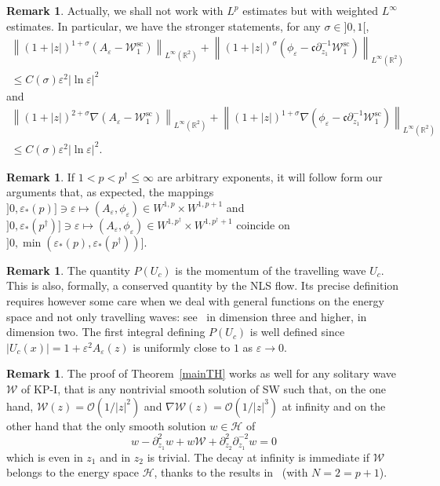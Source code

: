 \documentclass[10pt]{amsart}
\theoremstyle{definition}\newtheorem{defi}[theo]{Definition}\newtheorem{rema}[theo]{Remark}\newtheorem{exam}[theo]{Example}\newtheorem{exem}[theo]{Example}\newtheorem{nota}[theo]{Notation}
\newcommand*\p{\partial}
\newcommand*\R{\mathbb R}
\renewcommand{\sc}{\mathrm{sc}}
\newcommand*\BO{\mathcal{O}}
\newcommand*\BH{\mathcal{H}}
\newcommand*\BW{\mathcal{W}}
\newcommand*\cs{{\mathfrak c}}
\newcommand*\ii{\infty}
\newcommand*\ls{\leqslant }
\newcommand*\e{\varepsilon}
\newcommand*\lne{\lvert \ln \varepsilon \rvert}
\newcommand*\s{\sigma}
\begin{document}
\begin{rema}
Actually, we shall not work with $L^p $ estimates but with weighted $ L^\ii $ estimates. In particular, we have the stronger statements, for any $\s \in]0,1 [$,
\begin{multline*}
\left\| (1+|z|)^{1+\s} \left(A_\e - \BW_1^{\sc}\right) \right\|_{ L^\ii (\R^2)} + \left\|(1+|z|)^{\s} \left(\phi_\e - \cs \p_{z_1}^{-1} \BW_1^{\sc}\right)\right\|_{ L^\ii (\R^2)}
\\
\ls C (\s) \e^2 \lne^2
\end{multline*}
and
\begin{multline*}
\left\| (1+|z|)^{2+\s} \nabla (A_\e - \BW_1^{\sc}) \right\|_{ L^\ii (\R^2)} + \left\| (1+|z|)^{1+\s} \nabla \left(\phi_\e - \cs \p_{z_1}^{-1} \BW_1^{\sc}\right) \right\|_{ L^\ii (\R^2)}\\
\ls C (\s) \e^2 \lne^2.
\end{multline*}
\end{rema}

\begin{rema}
If $ 1 < p < p^\dag \ls \ii $ are arbitrary exponents, it will follow form our arguments that, as expected, the mappings $] 0, \e_*(p)] \ni \e \mapsto (A_\e, \phi_\e)
\in W^{1,p} \times W^{1,p+1 }$ and $] 0, \e_*(p^\dag)] \ni \e \mapsto (A_\e, \phi_\e) \in W^{1,p^\dag} \times W^{1,p^\dag+1 } $ coincide on $] 0, \min(\e_*(p), \e_*(p^\dag))] $.
\end{rema}

\begin{rema}
The quantity $ P (U_c) $ is the momentum of the travelling wave $ U_c $. This is also, formally, a conserved quantity by the NLS flow. Its precise definition requires however some care when we deal with general functions on the energy space and not only travelling waves: see~\cite{M_exist} in dimension three and higher, \cite{CM1} in dimension two. The first integral defining $ P(U_c) $ is well defined since $ |U_c (x)| = 1 + \e^2 A_\e(z) $ is uniformly close to $1$ as $ \e \to 0 $.
\end{rema}


\begin{rema}
The proof of Theorem~\ref{mainTH} works as well for any solitary wave $ \BW $ of KP-I, that is any nontrivial smooth solution of SW such that, on the one hand, $ \BW (z) = \BO(1/ |z|^2) $ and $ \nabla \BW (z) = \BO(1/ |z|^3) $ at infinity and on the other hand that the only smooth solution $ w \in \BH $ of
\[
w - \p^2_{z_1} w + w \BW + \p_{z_2}^2 \p_{z_1}^{-2} w = 0
\]
which is even in $z_1 $ and in $z_2 $ is trivial. The decay at infinity is immediate if $ \BW $ belongs to the energy space $ \BH $, thanks to the results in~\cite[Theorem~1.11]{Gravos} (with $ N= 2 = p+1 $).
\end{rema}
\end{document}
